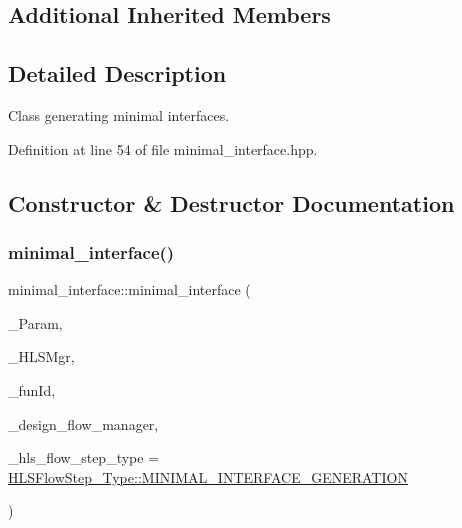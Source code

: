 \subsection*{Additional Inherited Members}


\subsection{Detailed Description}
Class generating minimal interfaces. 

Definition at line 54 of file minimal\+\_\+interface.\+hpp.



\subsection{Constructor \& Destructor Documentation}
\mbox{\label{classminimal__interface_aeceaa0bf5f7b0b4aa1d947d40ff60c77}} 
\subsubsection{\texorpdfstring{minimal\+\_\+interface()}{minimal\_interface()}}
{\footnotesize\ttfamily minimal\+\_\+interface\+::minimal\+\_\+interface (\begin{DoxyParamCaption}\item[{const \hyperlink{Parameter_8hpp_a37841774a6fcb479b597fdf8955eb4ea}{Parameter\+Const\+Ref}}]{\+\_\+\+Param,  }\item[{const \hyperlink{hls__manager_8hpp_acd3842b8589fe52c08fc0b2fcc813bfe}{H\+L\+S\+\_\+manager\+Ref}}]{\+\_\+\+H\+L\+S\+Mgr,  }\item[{unsigned int}]{\+\_\+fun\+Id,  }\item[{const Design\+Flow\+Manager\+Const\+Ref}]{\+\_\+design\+\_\+flow\+\_\+manager,  }\item[{const \hyperlink{hls__step_8hpp_ada16bc22905016180e26fc7e39537f8d}{H\+L\+S\+Flow\+Step\+\_\+\+Type}}]{\+\_\+hls\+\_\+flow\+\_\+step\+\_\+type = {\ttfamily \hyperlink{hls__step_8hpp_ada16bc22905016180e26fc7e39537f8da30b267b74a2ad7262c635562e1d191a0}{H\+L\+S\+Flow\+Step\+\_\+\+Type\+::\+M\+I\+N\+I\+M\+A\+L\+\_\+\+I\+N\+T\+E\+R\+F\+A\+C\+E\+\_\+\+G\+E\+N\+E\+R\+A\+T\+I\+ON}} }\end{DoxyParamCaption})}



